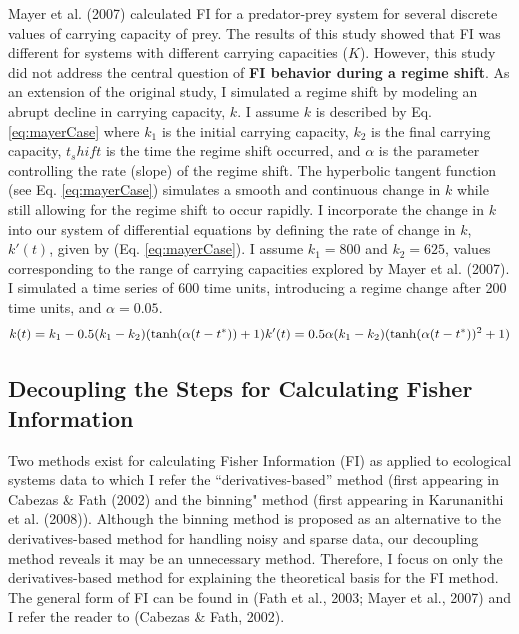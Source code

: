 \documentclass[12pt,twoside,openany]{reedthesis}
\begin{document}
Mayer et al. (2007) calculated FI for a predator-prey system for several discrete values of carrying capacity of prey. The results of this study showed that FI was different for systems with different carrying capacities (\(K\)). However, this study did not address the central question of \textbf{FI behavior during a regime shift}. As an extension of the original study, I simulated a regime shift by modeling an abrupt decline in carrying capacity, \(k\). I assume \(k\) is described by Eq. \eqref{eq:mayerCase} where \(k_1\) is the initial carrying capacity, \(k_2\) is the final carrying capacity, \(t_shift\) is the time the regime shift occurred, and \(\alpha\) is the parameter controlling the rate (slope) of the regime shift. The hyperbolic tangent function (see Eq. \eqref{eq:mayerCase}) simulates a smooth and continuous change in \(k\) while still allowing for the regime shift to occur rapidly. I incorporate the change in \(k\) into our system of differential equations by defining the rate of change in \(k\), \(k'(t)\), given by (Eq. \eqref{eq:mayerCase}). I assume \(k_1=800\) and \(k_2=625\), values corresponding to the range of carrying capacities explored by Mayer et al. (2007). I simulated a time series of 600 time units, introducing a regime change after 200 time units, and \(\alpha=0.05\).
\begin{equation}  
  k(t) = k_1  - 0.5(k_1-k_2)(\tanh(\alpha (t-t^*))+1) \\ 
  k'(t) = 0.5\alpha (k_1-k_2)(\tanh(\alpha(t-t^*))^2 +1) 
\label{eq:mayerCase}
\end{equation}
\hypertarget{decoupling-the-steps-for-calculating-fisher-information}{%
\subsection{Decoupling the Steps for Calculating Fisher Information}\label{decoupling-the-steps-for-calculating-fisher-information}}

Two methods exist for calculating Fisher Information (FI) as applied to ecological systems data to which I refer the ``derivatives-based'' method (first appearing in Cabezas \& Fath (2002) and the binning" method (first appearing in Karunanithi et al. (2008)). Although the binning method is proposed as an alternative to the derivatives-based method for handling noisy and sparse data, our decoupling method reveals it may be an unnecessary method. Therefore, I focus on only the derivatives-based method for explaining the theoretical basis for the FI method. The general form of FI can be found in (Fath et al., 2003; Mayer et al., 2007) and I refer the reader to (Cabezas \& Fath, 2002).
\end{document}
